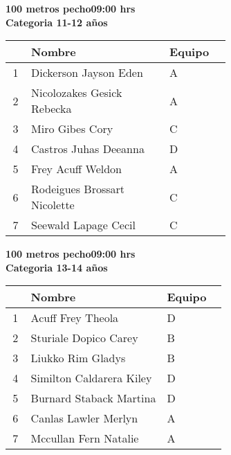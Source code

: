 \begin{minipage}{0.95\linewidth}\vspace{0.5cm} 
\begin{flushleft}
\textbf{
\hspace{-0.15cm}100 metros pecho\hspace{1.5cm}09:00 hrs \\Categoria 11-12 años}\vspace{-0.2cm} 
\end{flushleft}
\begin{tabular}{cp{0.63\linewidth}l}
\hline
& \textbf{Nombre} & \textbf{Equipo} \\ \hline
1 & Dickerson Jayson Eden & A \\ 
2 & Nicolozakes Gesick Rebecka & A \\ 
3 & Miro Gibes Cory & C \\ 
4 & Castros Juhas Deeanna & D \\ 
5 & Frey Acuff Weldon & A \\ 
6 & Rodeigues Brossart Nicolette & C \\ 
7 & Seewald Lapage Cecil & C \\ 
\end{tabular}
\end{minipage}
\begin{minipage}{0.95\linewidth}\vspace{0.5cm} 
\begin{flushleft}
\textbf{
\hspace{-0.15cm}100 metros pecho\hspace{1.5cm}09:00 hrs \\Categoria 13-14 años}\vspace{-0.2cm} 
\end{flushleft}
\begin{tabular}{cp{0.63\linewidth}l}
\hline
& \textbf{Nombre} & \textbf{Equipo} \\ \hline
1 & Acuff Frey Theola & D \\ 
2 & Sturiale Dopico Carey & B \\ 
3 & Liukko Rim Gladys & B \\ 
4 & Similton Caldarera Kiley & D \\ 
5 & Burnard Staback Martina & D \\ 
6 & Canlas Lawler Merlyn & A \\ 
7 & Mccullan Fern Natalie & A \\ 
\end{tabular}
\end{minipage}
